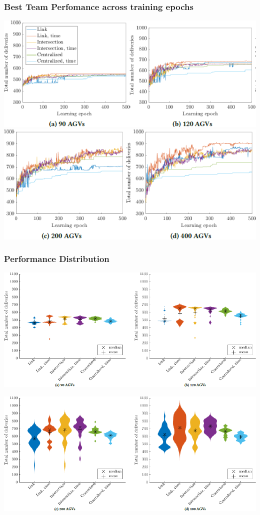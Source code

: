 \documentclass{beamer}
\begin{document}
	\begin{frame}
	\frametitle{Best Team Perfomance across training epochs}
	\begin{center}
		\includegraphics[height=0.425\textheight]{max0.png}
		\includegraphics[height=0.425\textheight]{max1.png}
	\end{center}
	\end{frame}
	
	\begin{frame}
	\frametitle{Performance Distribution}
	\begin{center}
    \includegraphics[height=0.425\textheight ]{violin1.png}
    
    
     \includegraphics[height=0.425\textheight]{violin2.png}
     \end{center}
	\end{frame}
	
\end{document}
